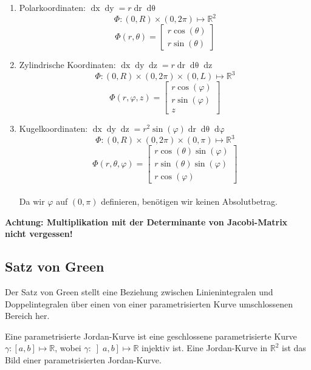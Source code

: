 \documentclass[a4paper,10pt]{article}
\def\R{\mathbb{R}}
\begin{document}
\begin{enumerate}
  \item{
    Polarkoordinaten: \(\mathop{dx}\mathop{dy} = r \mathop{dr} \mathop{d\theta}\)\\
    $$\varPhi: (0, R) \times (0, 2\pi) \mapsto \R^2$$
    $$\varPhi(r, \theta) = \begin{bmatrix}
      r \cos(\theta) \\
      r \sin(\theta)
    \end{bmatrix}$$
  }
  \item{
    Zylindrische Koordinaten: \(\mathop{dx} \mathop{dy} \mathop{dz} = r \mathop{dr} \mathop{d\theta} \mathop{dz}\)\\
    $$\varPhi: (0, R) \times (0, 2\pi) \times (0, L) \mapsto \R^3$$
    $$\varPhi(r, \varphi, z) = \begin{bmatrix}
      r \cos(\varphi) \\
      r \sin(\varphi) \\
      z
    \end{bmatrix}$$
  }
  \item{
    Kugelkoordinaten: \(\mathop{dx}\mathop{dy}\mathop{dz} = r^2 \sin(\varphi) \mathop{dr} \mathop{d\theta} \mathop{d\varphi}\)\\
    $$\varPhi: (0, R) \times (0, 2\pi) \times (0, \pi) \mapsto \R^3$$
    $$\varPhi(r, \theta, \varphi) = \begin{bmatrix}
      r \cos(\theta) \sin(\varphi) \\
      r \sin(\theta) \sin(\varphi) \\
      r \cos(\varphi)
    \end{bmatrix}$$\\
    Da wir $\varphi$ auf $(0, \pi)$ definieren, benötigen wir keinen Absolutbetrag.
  }
\end{enumerate}

\textbf{Achtung: Multiplikation mit der Determinante von Jacobi-Matrix nicht vergessen!}

\subsection{Satz von Green}
Der Satz von Green stellt eine Beziehung zwischen Linienintegralen und Doppelintegralen über einen von einer parametrisierten Kurve umschlossenen Bereich her. 

Eine parametrisierte Jordan-Kurve ist eine geschlossene parametrisierte Kurve \(\gamma : \left[a,b\right] \mapsto \R\), wobei \(\gamma : \left] a,b \right] \mapsto \R\) injektiv ist. Eine Jordan-Kurve in \(\R^2\) ist das Bild einer parametrisierten Jordan-Kurve.
\end{document}
